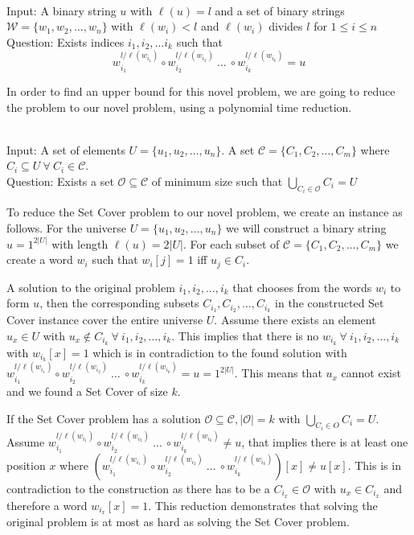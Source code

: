 \begin{defn}{\ \\}
	Input: A binary string $u$ with $\ell(u)= l$ and a set of binary strings $\mathcal{W}=\{w_1, w_2, \dots, w_n\}$ with $\ell(w_i) < l$ and $\ell(w_i)$ divides $l$ for $1 \leq i \leq n$\\
	Question: Exists indices $i_1, i_2, \dots i_k$ such that
	$$w_{i_1}^{l / \ell(w_{i_1})} \circ w_{i_2}^{l / \ell(w_{i_2})} ~\dots~ \circ w_{i_k}^{l / \ell(w_{i_k})} = u $$
\end{defn}

In order to find an upper bound for this novel problem, we are going to reduce the {} problem to our novel {} problem, using a polynomial time reduction.

\begin{defn}{\ \\}
	Input: A set of elements $U = \{u_1, u_2, \dots , u_n\}$. A set $\mathcal{C} = \{C_1, C_2, \dots , C_m\}$ where $C_i \subseteq U ~\forall~ C_i \in \mathcal{C}$.\\
	Question: Exists a set $\mathcal{O} \subseteq \mathcal{C}$ of minimum size such that $\underset{C_i \in \mathcal{O}}{\bigcup}C_i = U$
\end{defn}

To reduce the Set Cover problem to our novel problem, we create an instance as follows. For the universe $U = \{u_1, u_2, \dots, u_n\}$ we will construct a binary string $u= 1^{2|U|}$ with length $\ell(u) = 2|U|$. For each subset of $\mathcal{C} = \{C_1, C_2, \dots, C_m\}$ we create a word $w_i$ such that $w_i[j] = 1$ iff $u_j \in C_i$. 

A solution to the original problem $i_1, i_2, \dots, i_k$ that chooses from the words $w_i$ to form $u$, then the corresponding subsets $C_{i_1}, C_{i_2}, \dots, C_{i_k}$ in the constructed Set Cover instance cover the entire universe $U$. Assume there exists an element $u_x \in U$ with $u_x \not \in C_{i_k} ~\forall~ i_1, i_2, \dots, i_k$. This implies that there is no $w_{i_k} ~\forall~ i_1, i_2, \dots, i_k$ with $w_{i_k}[x]=1$ which is in contradiction to the found solution with $w_{i_1}^{l / \ell(w_{i_1})} \circ w_{i_2}^{l / \ell(w_{i_2})} ~\dots~ \circ w_{i_k}^{l / \ell(w_{i_k})} = u = 1^{2|U|}$. This means that $u_x$ cannot exist and we found a Set Cover of size $k$.

If the Set Cover problem has a solution $\mathcal{O} \subseteq \mathcal{C}, |\mathcal{O}|=k$ with $\bigcup_{C_i \in O} C_i = U$. Assume $w_{i_1}^{l / \ell(w_{i_1})} \circ w_{i_2}^{l / \ell(w_{i_2})} ~\dots~ \circ w_{i_k}^{l / \ell(w_{i_k})} \not = u$, that implies there is at least one position $x$ where $(w_{i_1}^{l / \ell(w_{i_1})} \circ w_{i_2}^{l / \ell(w_{i_2})} ~\dots~ \circ w_{i_k}^{l / \ell(w_{i_k})})[x] \not= u[x] $. This is in contradiction to the construction as there has to be a $C_{i_x} \in \mathcal{O}$ with $u_x \in C_{i_x}$ and therefore a word $w_{i_x}[x]=1$. This reduction demonstrates that solving the original problem is at most as hard as solving the Set Cover problem.


